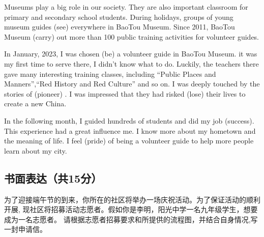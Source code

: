 \documentclass{ExamJHSEngl}
\begin{document}
\begin{spacing}{1.5}

Museums play a big role in our society. They are also  important classroom for primary and secondary school students. During holidays, groups of young museum guides  (see) everywhere in BaoTou Museum. Since 2011, BaoTou Museum  (carry) out more than 100 public training activities for volunteer guides.

In January, 2023, I was chosen  (be) a volunteer guide in BaoTou Museum.  it was my first time to serve there, I didn't know what to do. Luckily, the teachers there gave many interesting training classes, including “Public Places and Manners”,“Red History and Red Culture” and so on. I was deeply touched by the stories of  (pioneer) . I was impressed that they had risked  (lose) their lives to create a new China.

In the following month, I guided hundreds of students and did my job  (success). This experience had a great influence  me. I know more about my hometown and the meaning of life. I feel  (pride) of being a volunteer guide to help more people learn about my city.

\end{spacing}



\subsection{书面表达（共15分）}

为了迎接端午节的到来，你所在的社区将举办一场庆祝活动。为了保证活动的顺利开展, 现社区将招募活动志愿者。假如你是李明，阳光中学一名九年级学生，想要成为一名志愿者。 请根据志愿者招募要求和所提供的流程图，并结合自身情况,写一封申请信。
\end{document}
